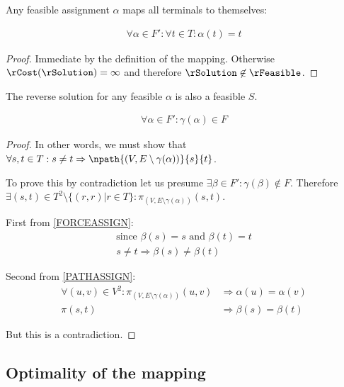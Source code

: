 \begin{lemma}
\label{FORCEASSIGN}
Any feasible assignment $\alpha$ maps all terminals to themselves:

\begin{align}
	\nonumber \forall \alpha \in F' : \forall t \in T : \alpha(t) = t
\end{align}
\end{lemma}
\begin{proof}
Immediate by the definition of the mapping.
Otherwise $\rCost(\rSolution) = \infty$ and therefore $\rSolution \not\in \rFeasible$.
\end{proof}

\begin{lemma}
\label{REVERSEFEASABLE}
The reverse solution for any feasible $\alpha$ is also a feasible $S$.

\begin{align}
	\nonumber \forall \alpha \in F' : \gamma(\alpha) \in F
\end{align}
\end{lemma}
\begin{proof}
In other words, we must show that $\forall s, t \in T : s \neq t \Rightarrow \npath{(V, E \setminus \gamma(\alpha))}{s}{t}$.

To prove this by contradiction let us presume $\exists \beta \in F' : \gamma(\beta) \not\in F$.
Therefore $\exists (s, t) \in T^2 \setminus \{(r,r) | r \in T\} : \pi_{(V, E \setminus \gamma(\alpha))}(s, t)$.

First from \ref{FORCEASSIGN}:
\begin{align}
	\nonumber \mbox{since } \beta(s) = s \mbox{ and } \beta(t) = t \\
	\nonumber s \neq t \Rightarrow \beta(s) \neq \beta(t)
\end{align}

Second from \ref{PATHASSIGN}:
\begin{align}
	\nonumber \forall (u, v) \in V^2 : \pi_{(V, E \setminus \gamma(\alpha))}(u,v) & \Rightarrow \alpha(u) = \alpha(v) \\
	\nonumber \pi(s, t) & \Rightarrow \beta(s) = \beta(t)
\end{align}

But this is a contradiction.
\end{proof}

\subsection{Optimality of the mapping}

